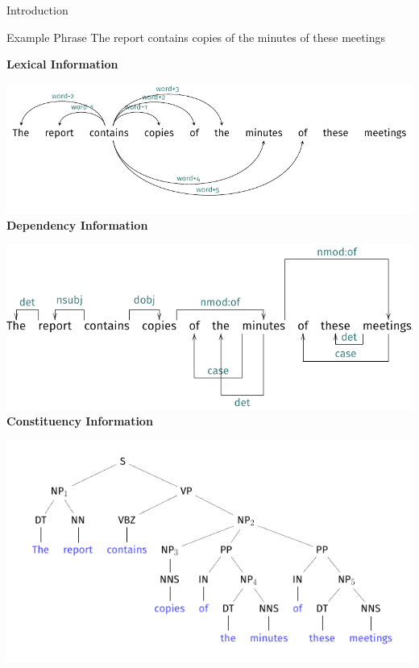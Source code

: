 \documentclass[10pt,xcolor=table]{beamer}
\begin{document}
\begin{frame}{Introduction}

\begin{block}{Example Phrase}
The report contains copies of the minutes of these meetings
\end{block}
\vspace{4pt}	

\begin{overprint}
	  \textbf{Lexical Information}

	  \centering	  
      \includegraphics[width=\linewidth]{img/tree/lexical_tree.pdf}
	  \textbf{Dependency Information}  
  	  
  	  \centering
      \includegraphics[width=\linewidth]{img/tree/dep_tree.pdf}
	  \textbf{Constituency Information}  
	  
	  \centering
      \includegraphics[width=\linewidth]{img/tree/tree.pdf}
\end{overprint}


\end{frame}
\end{document}

